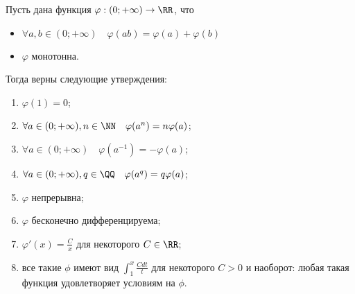 \documentclass[12pt,a4paper]{article}
\begin{document}
    \begin{theorem}
        Пусть дана функция $\varphi: (0; +\infty) \to \RR$, что
        \begin{itemize}
            \item $\forall a, b \in (0; +\infty)\quad \varphi(ab) = \varphi(a) + \varphi(b)$
            \item $\varphi$ монотонна.
        \end{itemize}
        Тогда верны следующие утверждения:
        \begin{enumerate}
            \item $\varphi(1) = 0$;
            \item $\forall a \in (0; +\infty), n \in \NN\quad \varphi(a^n) = n\varphi(a)$;
            \item $\forall a \in (0; +\infty)\quad \varphi(a^{-1}) = -\varphi(a)$;
            \item $\forall a \in (0; +\infty), q \in \QQ\quad \varphi(a^q) = q\varphi(a)$;
            \item $\varphi$ непрерывна;
            \item $\varphi$ бесконечно дифференцируема;
            \item $\varphi'(x) = \frac{C}{x}$ для некоторого $C \in \RR$;
            \item все такие $\phi$ имеют вид $\int_1^x \frac{Cdt}{t}$ для некоторого $C > 0$ и наоборот: любая такая функция удовлетворяет условиям на $\phi$.
        \end{enumerate}
    \end{theorem}
\end{document}
